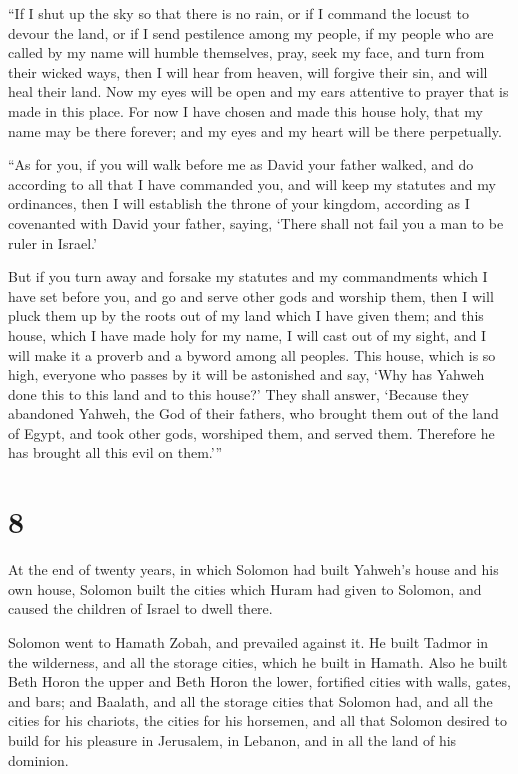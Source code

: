  ``If I shut up the sky so that there is no rain, or if I
command the locust to devour the land, or if I send pestilence among my
people,  if my people who are called by my name will humble
themselves, pray, seek my face, and turn from their wicked ways, then I
will hear from heaven, will forgive their sin, and will heal their land.
 Now my eyes will be open and my ears attentive to prayer
that is made in this place.  For now I have chosen and made
this house holy, that my name may be there forever; and my eyes and my
heart will be there perpetually.

 ``As for you, if you will walk before me as David your
father walked, and do according to all that I have commanded you, and
will keep my statutes and my ordinances,  then I will
establish the throne of your kingdom, according as I covenanted with
David your father, saying, `There shall not fail you a man to be ruler
in Israel.'

 But if you turn away and forsake my statutes and my
commandments which I have set before you, and go and serve other gods
and worship them,  then I will pluck them up by the roots
out of my land which I have given them; and this house, which I have
made holy for my name, I will cast out of my sight, and I will make it a
proverb and a byword among all peoples.  This house, which
is so high, everyone who passes by it will be astonished and say, `Why
has Yahweh done this to this land and to this house?'  They
shall answer, `Because they abandoned Yahweh, the God of their fathers,
who brought them out of the land of Egypt, and took other gods,
worshiped them, and served them. Therefore he has brought all this evil
on them.'''

\hypertarget{section-7}{%
\section{8}\label{section-7}}

 At the end of twenty years, in which Solomon had built
Yahweh's house and his own house,  Solomon built the cities
which Huram had given to Solomon, and caused the children of Israel to
dwell there.

 Solomon went to Hamath Zobah, and prevailed against it.
 He built Tadmor in the wilderness, and all the storage
cities, which he built in Hamath.  Also he built Beth Horon
the upper and Beth Horon the lower, fortified cities with walls, gates,
and bars;  and Baalath, and all the storage cities that
Solomon had, and all the cities for his chariots, the cities for his
horsemen, and all that Solomon desired to build for his pleasure in
Jerusalem, in Lebanon, and in all the land of his dominion.

